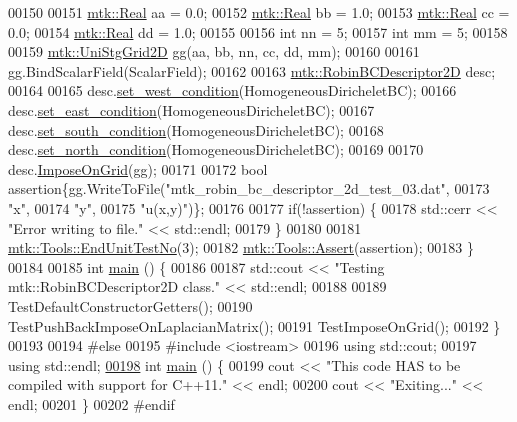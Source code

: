 \begin{DoxyCode}
00150 
00151   \hyperlink{group__c01-roots_gac080bbbf5cbb5502c9f00405f894857d}{mtk::Real} aa = 0.0;
00152   \hyperlink{group__c01-roots_gac080bbbf5cbb5502c9f00405f894857d}{mtk::Real} bb = 1.0;
00153   \hyperlink{group__c01-roots_gac080bbbf5cbb5502c9f00405f894857d}{mtk::Real} cc = 0.0;
00154   \hyperlink{group__c01-roots_gac080bbbf5cbb5502c9f00405f894857d}{mtk::Real} dd = 1.0;
00155 
00156   \textcolor{keywordtype}{int} nn = 5;
00157   \textcolor{keywordtype}{int} mm = 5;
00158 
00159   \hyperlink{classmtk_1_1UniStgGrid2D}{mtk::UniStgGrid2D} gg(aa, bb, nn, cc, dd, mm);
00160 
00161   gg.BindScalarField(ScalarField);
00162 
00163   \hyperlink{classmtk_1_1RobinBCDescriptor2D}{mtk::RobinBCDescriptor2D} desc;
00164 
00165   desc.\hyperlink{classmtk_1_1RobinBCDescriptor2D_aeaff87510dc1773effc0b5429579de23}{set\_west\_condition}(HomogeneousDiricheletBC);
00166   desc.\hyperlink{classmtk_1_1RobinBCDescriptor2D_a94570f6e741bb00038c4bf81842d226c}{set\_east\_condition}(HomogeneousDiricheletBC);
00167   desc.\hyperlink{classmtk_1_1RobinBCDescriptor2D_a3fbdf58ba24861011fd852f0c642a4c8}{set\_south\_condition}(HomogeneousDiricheletBC);
00168   desc.\hyperlink{classmtk_1_1RobinBCDescriptor2D_ade17884e6a2636a7c6f989602a0052e0}{set\_north\_condition}(HomogeneousDiricheletBC);
00169 
00170   desc.\hyperlink{classmtk_1_1RobinBCDescriptor2D_ac9564bc46c196cbf4720a0e4b93da8b0}{ImposeOnGrid}(gg);
00171 
00172   \textcolor{keywordtype}{bool} assertion\{gg.WriteToFile(\textcolor{stringliteral}{"mtk\_robin\_bc\_descriptor\_2d\_test\_03.dat"},
00173                                 \textcolor{stringliteral}{"x"},
00174                                 \textcolor{stringliteral}{"y"},
00175                                 \textcolor{stringliteral}{"u(x,y)"})\};
00176 
00177   \textcolor{keywordflow}{if}(!assertion) \{
00178     std::cerr << \textcolor{stringliteral}{"Error writing to file."} << std::endl;
00179   \}
00180 
00181   \hyperlink{classmtk_1_1Tools_aba67d9dc35c9c1c49430fcc9ea035e03}{mtk::Tools::EndUnitTestNo}(3);
00182   \hyperlink{classmtk_1_1Tools_ac6804df469c94ab6a796fb64f1e44a89}{mtk::Tools::Assert}(assertion);
00183 \}
00184 
00185 \textcolor{keywordtype}{int} \hyperlink{mtk__robin__bc__descriptor__2d__test_8cc_ae66f6b31b5ad750f1fe042a706a4e3d4}{main} () \{
00186 
00187   std::cout << \textcolor{stringliteral}{"Testing mtk::RobinBCDescriptor2D class."} << std::endl;
00188 
00189   TestDefaultConstructorGetters();
00190   TestPushBackImposeOnLaplacianMatrix();
00191   TestImposeOnGrid();
00192 \}
00193 
00194 \textcolor{preprocessor}{#else}
00195 \textcolor{preprocessor}{#include <iostream>}
00196 \textcolor{keyword}{using} std::cout;
00197 \textcolor{keyword}{using} std::endl;
\hypertarget{mtk__robin__bc__descriptor__2d__test_8cc_source_l00198}{}\hyperlink{mtk__robin__bc__descriptor__2d__test_8cc_ae66f6b31b5ad750f1fe042a706a4e3d4}{00198} \textcolor{keywordtype}{int} \hyperlink{mtk__robin__bc__descriptor__2d__test_8cc_ae66f6b31b5ad750f1fe042a706a4e3d4}{main} () \{
00199   cout << \textcolor{stringliteral}{"This code HAS to be compiled with support for C++11."} << endl;
00200   cout << \textcolor{stringliteral}{"Exiting..."} << endl;
00201 \}
00202 \textcolor{preprocessor}{#endif}
\end{DoxyCode}
